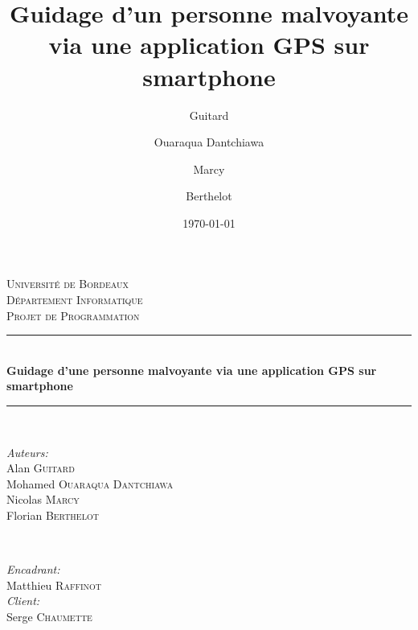 \documentclass[12pt]{report}
\title{Guidage d'un personne malvoyante via une application GPS sur smartphone}
\author{Guitard \and Ouaraqua Dantchiawa \and Marcy \and Berthelot}
\date{\today}
\begin{document}
\setcounter{secnumdepth}{3}
\begin{titlepage}

\newcommand{\HRule}{\rule{\linewidth}{0.5mm}} 


\center 
 


\textsc{\LARGE Université de Bordeaux}\\[1.5cm] 
\textsc{\Large Département Informatique}\\[0.5cm] 
\textsc{\large Projet de Programmation}\\[0.5cm] 


\HRule \\[0.5cm]
{ \LARGE \bfseries Guidage d’une personne malvoyante via une application GPS sur smartphone}\\[0.5cm]
\HRule \\[1.5cm]
 

\begin{minipage}{0.4\textwidth}
\begin{flushleft} \large
\emph{Auteurs:}\\
Alan \textsc{Guitard}\\
Mohamed \textsc{Ouaraqua Dantchiawa}\\
Nicolas \textsc{Marcy}\\
Florian \textsc{Berthelot}\\

\end{flushleft}
\end{minipage}
~
\begin{minipage}{0.4\textwidth}
\begin{flushright} \large
\emph{Encadrant:} \\
Matthieu \textsc{Raffinot}\\
\emph{Client:}\\
Serge \textsc{Chaumette} 
\end{flushright}
\end{minipage}\\[2cm]





\end{titlepage}
\end{document}
